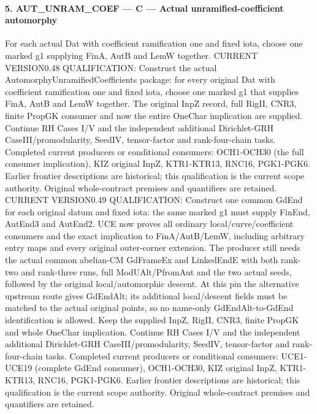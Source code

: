 \paragraph{5. AUT\_\allowbreak UNRAM\_\allowbreak COEF — C — Actual unramified-coefficient automorphy}

For each actual Dat with coefficient ramification one and fixed iota, choose one marked g1 supplying FinA, AutB and LemW together. CURRENT VERSION0.48 QUALIFICATION: Construct the actual AutomorphyUnramifiedCoefficients package: for every original Dat with coefficient ramification one and fixed iota, choose one marked g1 that supplies FinA, AutB and LemW together. The original InpZ record, full RigII, CNR3, finite PropGK consumer and now the entire OneChar implication are supplied. Continue RH Cases I/V and the independent additional Dirichlet-GRH CaseIII/promodularity, SeedIV, tensor-factor and rank-four-chain tasks. Completed current producers or conditional consumers: OCH1-OCH30 (the full consumer implication), KIZ original InpZ, KTR1-KTR13, RNC16, PGK1-PGK6. Earlier frontier descriptions are historical; this qualification is the current scope authority. Original whole-contract premises and quantifiers are retained. CURRENT VERSION0.49 QUALIFICATION: Construct one common GdEnd for each original datum and fixed iota: the same marked g1 must supply FinEnd, AutEnd3 and AutEnd2. UCE now proves all ordinary local/curve/coefficient consumers and the exact implication to FinA/AutB/LemW, including arbitrary entry maps and every original outer-corner extension. The producer still needs the actual common abelian-CM GdFrameEx and LinkedEndE with both rank-two and rank-three runs, full ModUAlt/PfromAut and the two actual seeds, followed by the original local/automorphic descent. At this pin the alternative upstream route gives GdEndAlt; its additional local/descent fields must be matched to the actual original points, so no name-only GdEndAlt-to-GdEnd identification is allowed. Keep the supplied InpZ, RigII, CNR3, finite PropGK and whole OneChar implication. Continue RH Cases I/V and the independent additional Dirichlet-GRH CaseIII/promodularity, SeedIV, tensor-factor and rank-four-chain tasks. Completed current producers or conditional consumers: UCE1-UCE19 (complete GdEnd consumer), OCH1-OCH30, KIZ original InpZ, KTR1-KTR13, RNC16, PGK1-PGK6. Earlier frontier descriptions are historical; this qualification is the current scope authority. Original whole-contract premises and quantifiers are retained.

